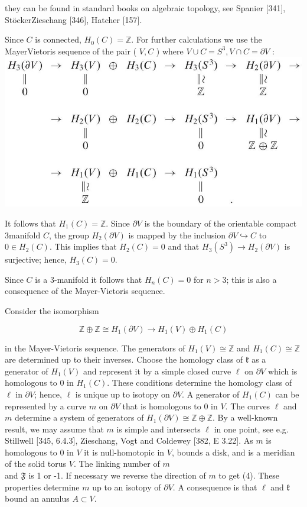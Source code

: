\documentclass[10pt, letterpaper]{article}
\begin{document}
they can be found in standard books on algebraic topology, see Spanier [341], StöckerZieschang [346], Hatcher [157].

Since $C$ is connected, $H_{0}(C)=\mathbb{Z}$. For further calculations we use the MayerVietoris sequence of the pair ( $V, C$ ) where $V \cup C=S^{3}, V \cap C=\partial V$ :\\
\includegraphics[scale=0.2, center]{2025_05_21_9c06be8de7a55410f8c1g-045}

It follows that $H_{1}(C)=\mathbb{Z}$. Since $\partial V$ is the boundary of the orientable compact 3manifold $C$, the group $H_{2}(\partial V)$ is mapped by the inclusion $\partial V \hookrightarrow C$ to $0 \in H_{2}(C)$. This implies that $H_{2}(C)=0$ and that $H_{3}\left(S^{3}\right) \rightarrow H_{2}(\partial V)$ is surjective; hence, $H_{3}(C)=0$.

Since $C$ is a 3-manifold it follows that $H_{n}(C)=0$ for $n>3$; this is also a consequence of the Mayer-Vietoris sequence.

Consider the isomorphism

$$
\mathbb{Z} \oplus \mathbb{Z} \cong H_{1}(\partial V) \rightarrow H_{1}(V) \oplus H_{1}(C)
$$

in the Mayer-Vietoris sequence. The generators of $H_{1}(V) \cong \mathbb{Z}$ and $H_{1}(C) \cong \mathbb{Z}$ are determined up to their inverses. Choose the homology class of $\mathfrak{k}$ as a generator of $H_{1}(V)$ and represent it by a simple closed curve $\ell$ on $\partial V$ which is homologous to 0 in $H_{1}(C)$. These conditions determine the homology class of $\ell$ in $\partial V$; hence, $\ell$ is unique up to isotopy on $\partial V$. A generator of $H_{1}(C)$ can be represented by a curve $m$ on $\partial V$ that is homologous to 0 in $V$. The curves $\ell$ and $m$ determine a system of generators of $H_{1}(\partial V) \cong \mathbb{Z} \oplus \mathbb{Z}$. By a well-known result, we may assume that $m$ is simple and intersects $\ell$ in one point, see e.g. Stillwell [345, 6.4.3], Zieschang, Vogt and Coldewey [382, E 3.22]. As $m$ is homologous to 0 in $V$ it is null-homotopic in $V$, bounds a disk, and is a meridian of the solid torus $V$. The linking number of $m$\\
and $\mathfrak{F}$ is 1 or -1. If necessary we reverse the direction of $m$ to get (4). These properties determine $m$ up to an isotopy of $\partial V$. A consequence is that $\ell$ and $\mathfrak{k}$ bound an annulus $A \subset V$.
\end{document}
